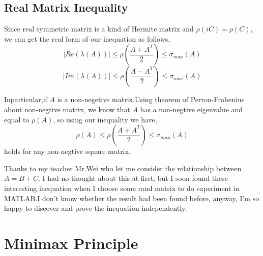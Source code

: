 \documentclass[a4paper,12pt]{article}
\begin{document}
\subsection*{Real Matrix Inequality}

Since real symmetric matrix is a kind of Hermite matrix and $\rho(iC)=\rho(C)$, we can get the real form of our inequation as follows,
\[ |Re(\lambda(A))| \leq \rho(\frac{A+A^T}{2}) \leq \sigma_{max}(A) \] 
\[ |Im(\lambda(A))| \leq \rho(\frac{A-A^T}{2}) \leq \sigma_{max}(A) \] 

Inparticular,if $A$ is a non-negetive matrix.Using theorem of Perron-Frobenius about non-negtive matrix, we know that $A$ has a non-negtive eigenvalue and equal to $\rho(A)$, so using our inequality we have,
\[\rho(A) \leq \rho(\frac{A+A^T}{2}) \leq \sigma_{max}(A) \]
holds for any non-negtive square matrix.

Thanks to my teacher Mr.Wei who let me consider the relationship between $A = B + C$. I had no thought about this at first, but I soon found these interesting inequation when I choose some rand matrix to do experiment in MATLAB.I don't know whether the result had been found before, anyway, I'm so happy to discover and prove the inequation independently.


\section{Minimax Principle}
\end{document}
